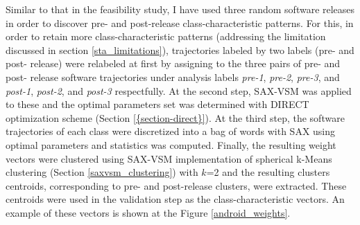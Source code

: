 Similar to that in the feasibility study, I have used three random software releases in order to discover pre- and post-release class-characteristic patterns. For this, in order to retain more class-characteristic patterns (addressing the limitation discussed in section \ref{sta_limitations}), trajectories labeled by two labels (pre- and post- release) were relabeled at first by assigning to the three pairs of  pre- and post- release software trajectories under analysis labels \textit{pre-1}, \textit{pre-2}, \textit{pre-3}, and \textit{post-1}, \textit{post-2}, and \textit{post-3} respectfully. At the second step, SAX-VSM was applied to these and the optimal parameters set was determined with DIRECT optimization scheme (Section \ref{{section-direct}}). At the third step, the software trajectories of each class were discretized into a bag of words with SAX using optimal parameters and \tfidf statistics was computed. Finally, the resulting weight vectors were clustered using SAX-VSM implementation of spherical k-Means clustering (Section \ref{saxvsm_clustering}) with $k$=2 and the resulting clusters centroids, corresponding to pre- and post-release clusters, were extracted. These centroids were used in the validation step as the class-characteristic vectors. An example of these vectors is shown at the Figure \ref{android_weights}.

